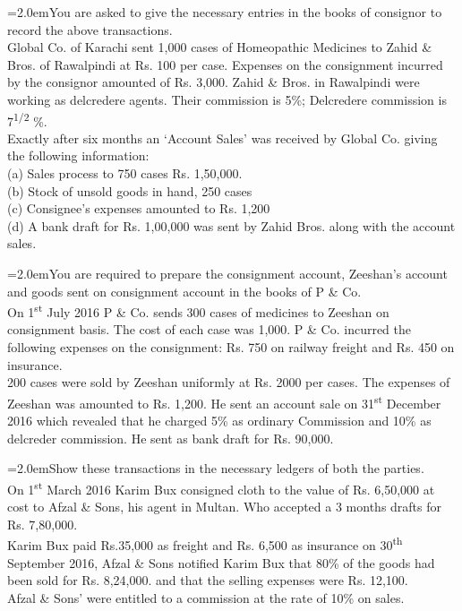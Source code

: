 \documentclass[11pt,a4paper]{article}
\newcommand{\lqn}[2]{\Needspace{6\baselineskip}\par\medskip\noindent\hangindent=2.0em\hangafter=1\makebox[2.0em][l]{\textbf{#1.}}#2\par}
\begin{document}
\lqn{35}{You are asked to give the necessary entries in the books of consignor to record the above transactions.\\
Global Co. of Karachi sent 1,000 cases of Homeopathic Medicines to Zahid \& Bros. of Rawalpindi at Rs. 100 per case. Expenses on the consignment incurred by the consignor amounted of Rs. 3,000. Zahid \& Bros. in Rawalpindi were working as delcredere agents. Their commission is 5\%; Delcredere commission is 7\textsuperscript{1/2}  \%.\\
Exactly after six months an ‘Account Sales’ was received by Global Co. giving the following information:\\
(a)  Sales process to 750 cases Rs. 1,50,000.\\
(b) Stock of unsold goods in hand, 250 cases\\
(c) Consignee’s expenses amounted to Rs. 1,200\\
(d) A bank draft for Rs. 1,00,000 was sent by Zahid Bros. along with the account sales.\par
}
\lqn{36}{You are required to prepare the consignment account, Zeeshan’s account and goods sent on consignment account in the books of P \& Co.\\
On 1\textsuperscript{st}  July 2016 P \& Co. sends 300 cases of medicines to Zeeshan on consignment basis. The cost of each case was 1,000. P \& Co. incurred the following expenses on the consignment: Rs. 750 on railway freight and Rs. 450 on insurance.\\
200 cases were sold by Zeeshan uniformly at Rs. 2000 per cases. The expenses of Zeeshan was amounted to Rs. 1,200. He sent an account sale on 31\textsuperscript{st}  December 2016 which revealed that he charged 5\% as ordinary Commission and 10\% as delcreder commission. He sent as bank draft for Rs. 90,000.\par
}
\lqn{37}{Show these transactions in the necessary ledgers of both the parties.\\
On 1\textsuperscript{st}  March 2016 Karim Bux consigned cloth to the value of Rs. 6,50,000 at cost to Afzal \& Sons, his agent in Multan. Who accepted a 3 months drafts for Rs. 7,80,000.\\
Karim Bux paid Rs.35,000 as freight and Rs. 6,500 as insurance on 30\textsuperscript{th}  September 2016, Afzal \& Sons notified Karim Bux that 80\% of the goods had been sold for Rs. 8,24,000. and that the selling expenses were Rs. 12,100.\\
Afzal \& Sons’ were entitled to a commission at the rate of 10\% on sales.\par
}
\end{document}
